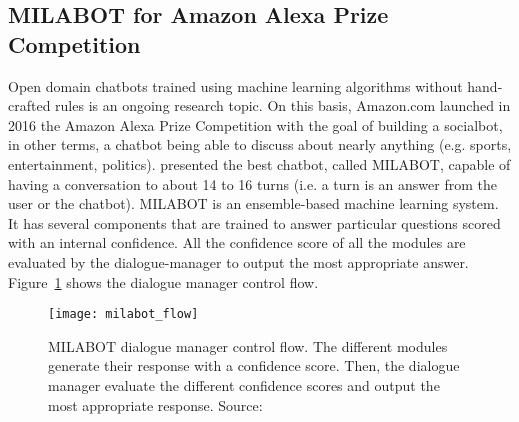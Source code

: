 \subsection{MILABOT for Amazon Alexa Prize Competition}
Open domain chatbots trained using machine learning algorithms without hand-crafted rules is an ongoing research topic. On this basis, Amazon.com launched in 2016 the Amazon Alexa Prize Competition with the goal of building a socialbot, in other terms, a chatbot being able to discuss about nearly anything (e.g. sports, entertainment, politics). \citet{alexa-1709.02349} presented the best chatbot, called MILABOT, capable of having a conversation to about 14 to 16 turns (i.e. a turn is an answer from the user or the chatbot).
MILABOT is an ensemble-based machine learning system. It has several components that are trained to answer particular questions scored with an internal confidence. All the confidence score of all the modules are evaluated by the dialogue-manager to output the most appropriate answer. Figure~\ref{fig:milabot-flow} shows the dialogue manager control flow.

\begin{figure}
    \centering
    \texttt{[image: milabot\_flow]}
    \decoRule
    \caption[MILABOT dialogue manager control flow]{MILABOT dialogue manager control flow. The different modules generate their response with a confidence score. Then, the dialogue manager evaluate the different confidence scores and output the most appropriate response. Source:~\citet{alexa-1709.02349}}
    \label{fig:milabot-flow}
\end{figure}
